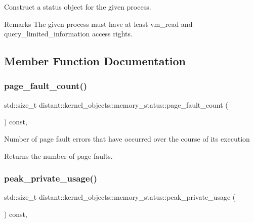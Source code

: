 Construct a status object for the given process. 

\begin{DoxyRemark}{Remarks}
The given process must have at least vm\+\_\+read and query\+\_\+limited\+\_\+information access rights. 
\end{DoxyRemark}


\subsection{Member Function Documentation}
\mbox{\label{classdistant_1_1kernel__objects_1_1memory__status_addb2d11cb7afc3c9a7048818a7a3ee28}} 
\subsubsection{\texorpdfstring{page\+\_\+fault\+\_\+count()}{page\_fault\_count()}}
{\footnotesize\ttfamily std\+::size\+\_\+t distant\+::kernel\+\_\+objects\+::memory\+\_\+status\+::page\+\_\+fault\+\_\+count (\begin{DoxyParamCaption}{ }\end{DoxyParamCaption}) const\hspace{0.3cm}{\ttfamily [inline]}, {\ttfamily [noexcept]}}

Number of page fault errors that have occurred over the course of its execution \begin{DoxyReturn}{Returns}
the number of page faults. 
\end{DoxyReturn}
\mbox{\label{classdistant_1_1kernel__objects_1_1memory__status_a3bdbed9b383bb506c1bc486585e0f527}} 
\subsubsection{\texorpdfstring{peak\+\_\+private\+\_\+usage()}{peak\_private\_usage()}}
{\footnotesize\ttfamily std\+::size\+\_\+t distant\+::kernel\+\_\+objects\+::memory\+\_\+status\+::peak\+\_\+private\+\_\+usage (\begin{DoxyParamCaption}{ }\end{DoxyParamCaption}) const\hspace{0.3cm}{\ttfamily [inline]}, {\ttfamily [noexcept]}}


